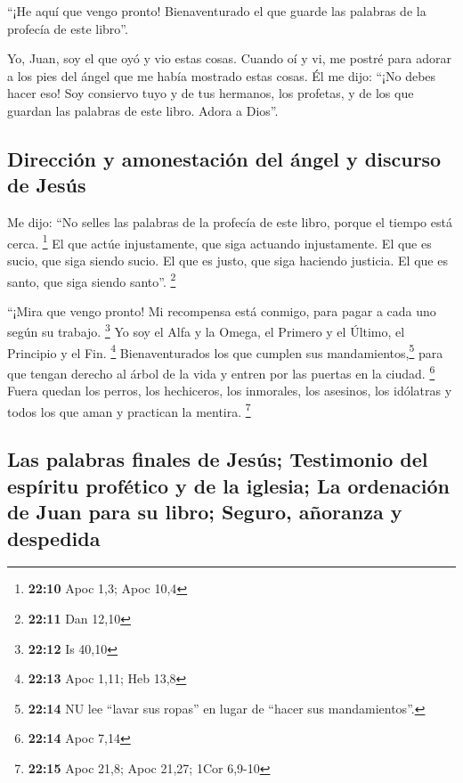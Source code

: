 \begin{paracol}{2}
 ``¡He aquí que vengo pronto! Bienaventurado el que guarde
las palabras de la profecía de este libro''.

 Yo, Juan, soy el que oyó y vio estas cosas. Cuando oí y
vi, me postré para adorar a los pies del ángel que me había mostrado
estas cosas.  Él me dijo: ``¡No debes hacer eso! Soy
consiervo tuyo y de tus hermanos, los profetas, y de los que guardan las
palabras de este libro. Adora a Dios''.

\hypertarget{direcciuxf3n-y-amonestaciuxf3n-del-uxe1ngel-y-discurso-de-jesuxfas}{%
\subsection{Dirección y amonestación del ángel y discurso de
Jesús}\label{direcciuxf3n-y-amonestaciuxf3n-del-uxe1ngel-y-discurso-de-jesuxfas}}

 Me dijo: ``No selles las palabras de la profecía de este
libro, porque el tiempo está cerca. \footnote{\textbf{22:10} Apoc 1,3;
  Apoc 10,4}  El que actúe injustamente, que siga
actuando injustamente. El que es sucio, que siga siendo sucio. El que es
justo, que siga haciendo justicia. El que es santo, que siga siendo
santo''. \footnote{\textbf{22:11} Dan 12,10}

 ``¡Mira que vengo pronto! Mi recompensa está conmigo,
para pagar a cada uno según su trabajo. \footnote{\textbf{22:12} Is
  40,10}  Yo soy el Alfa y la Omega, el Primero y el
Último, el Principio y el Fin. \footnote{\textbf{22:13} Apoc 1,11; Heb
  13,8}  Bienaventurados los que cumplen sus
mandamientos,\footnote{\textbf{22:14} NU lee ``lavar sus ropas'' en
  lugar de ``hacer sus mandamientos''.} para que tengan derecho al árbol
de la vida y entren por las puertas en la ciudad. \footnote{\textbf{22:14}
  Apoc 7,14}  Fuera quedan los perros, los hechiceros,
los inmorales, los asesinos, los idólatras y todos los que aman y
practican la mentira. \footnote{\textbf{22:15} Apoc 21,8; Apoc 21,27;
  1Cor 6,9-10}

\hypertarget{las-palabras-finales-de-jesuxfas-testimonio-del-espuxedritu-profuxe9tico-y-de-la-iglesia-la-ordenaciuxf3n-de-juan-para-su-libro-seguro-auxf1oranza-y-despedida}{%
\subsection{Las palabras finales de Jesús; Testimonio del espíritu
profético y de la iglesia; La ordenación de Juan para su libro; Seguro,
añoranza y
despedida}\label{las-palabras-finales-de-jesuxfas-testimonio-del-espuxedritu-profuxe9tico-y-de-la-iglesia-la-ordenaciuxf3n-de-juan-para-su-libro-seguro-auxf1oranza-y-despedida}}


\end{paracol}

